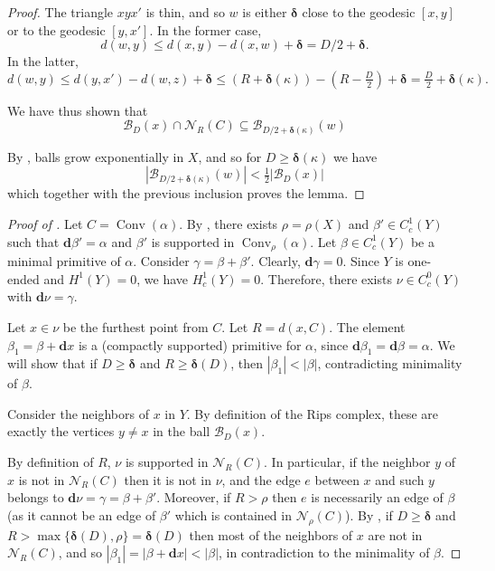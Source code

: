 \documentclass{amsart}
\numberwithin{equation}{section}
\theoremstyle{definition}
\newcommand{\bfd}{\mathbf{d}}
\newcommand{\calB}{\mathcal{B}}
\newcommand{\calN}{\mathcal{N}}
\newcommand{\bdelta}{{\boldsymbol\delta}}
\DeclareMathOperator{\conv}{Conv}
\begin{document}
\begin{proof}
    The triangle $xyx'$ is thin, and so $w$ is either $\bdelta$ close to the geodesic $[x,y]$ or to the geodesic $[y,x']$. In the former case, $$d(w,y)\le d(x,y)-d(x,w)+\bdelta = D/2+\bdelta.$$
    In the latter, $$d(w,y)\le d(y,x')-d(w,z)+\bdelta\le (R+\bdelta(\kappa)) - (R-\tfrac D2)+\bdelta=\tfrac D2 + \bdelta(\kappa).$$

    We have thus shown that 
    $$\calB_D(x)\cap \calN_R(C) \subseteq \calB_{D/2+\bdelta(\kappa)}(w)$$

    By \cite{coornaert1993mesures}, balls grow exponentially in $X$, and so
    for $D\ge \bdelta(\kappa)$ we have $$|\calB_{D/2+\bdelta(\kappa)}(w)|<\tfrac12 |\calB_D(x)|$$
    which together with the previous inclusion proves the lemma.
\end{proof}

\begin{proof}[Proof of ]
Let $C = \conv(\alpha)$.
By , there exists $\rho=\rho(X)$ and $\beta'\in C^1_c(Y)$ such that $\bfd \beta' = \alpha$ and $\beta'$ is supported in $\conv_{\rho}(\alpha)$.
Let $\beta \in C^1_c(Y)$ be a minimal primitive of $\alpha$.
Consider $\gamma = \beta+\beta'$. Clearly, $\bfd\gamma =0$. Since $Y$ is one-ended and $H^1(Y)=0$, we have  $H^1_c(Y)=0$.
Therefore, there exists $\nu\in C^0_c(Y)$ with $\bfd\nu = \gamma$.

Let $x\in \nu$ be the furthest point from $C$. 
Let $R=d(x,C)$. 
The element $\beta_1 = \beta+\bfd x$ is a (compactly supported) primitive for $\alpha$, since $\bfd \beta_1 = \bfd\beta=\alpha$.
We will show that if $D\ge \bdelta$ and $R\ge \bdelta(D)$, then $|\beta_1|<|\beta|$, contradicting minimality of $\beta$.

Consider the neighbors of $x$ in $Y$. By definition of the Rips complex, these are exactly the vertices $y\ne x$ in the ball $\calB_D(x)$.

By definition of $R$, $\nu$ is supported in $\calN_{R}(C)$. 
In particular, if the neighbor $y$ of $x$ is not in $\calN_{R}(C)$ then it is not in $\nu$, and the edge $e$ between $x$ and such $y$ belongs to $\bfd\nu = \gamma = \beta+\beta'$. 
Moreover, if $R > \rho$ then $e$ is necessarily an edge of $\beta$ (as it cannot be an edge of $\beta'$ which is contained in $\calN_\rho(C)$).
By , if $D\ge \bdelta$ and $R>\max\{\bdelta(D),\rho\}=\bdelta(D)$ then most of the neighbors of $x$ are not in $\calN_{R}(C)$, and so $|\beta_1|=|\beta + \bfd x|<|\beta|$, in contradiction to the minimality of $\beta$.
\end{proof}
\end{document}

